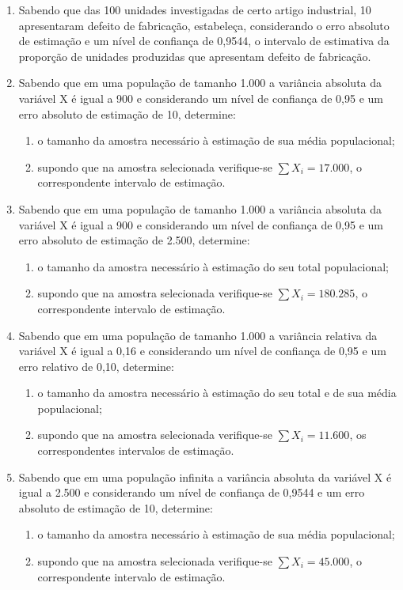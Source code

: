 \begin{enumerate}[resume]
\item Sabendo que das 100 unidades investigadas de certo artigo industrial, 10 apresentaram defeito de fabricação, estabeleça, considerando o erro absoluto de estimação e um nível de confiança de 0,9544, o intervalo de estimativa da proporção de
unidades produzidas que apresentam defeito de fabricação.

\item Sabendo que em uma população de tamanho 1.000 a variância absoluta da variável X é igual a 900 e considerando um nível de confiança de 0,95 e um erro absoluto de estimação de 10, determine:
	\begin{enumerate}
	\item o tamanho da amostra necessário à estimação de sua média populacional;
	\item supondo que na amostra selecionada verifique-se $\sum X_{i} = 17.000$, o correspondente intervalo de estimação.
	\end{enumerate}
	
\item Sabendo que em uma população de tamanho 1.000 a variância absoluta da variável X é igual a 900 e considerando um nível de confiança de 0,95 e um erro absoluto de estimação de 2.500, determine:
	\begin{enumerate}
	\item o tamanho da amostra necessário à estimação do seu total populacional;
	\item supondo que na amostra selecionada verifique-se $\sum X_{i} =  180.285$, o correspondente intervalo de estimação.
	\end{enumerate}

\item Sabendo que em uma população de tamanho 1.000 a variância relativa da variável X é igual a 0,16 e considerando um nível de confiança de 0,95 e um erro relativo de 0,10, determine:
	\begin{enumerate}
	\item o tamanho da amostra necessário à estimação do seu total e de sua média populacional;
	\item supondo que na amostra selecionada verifique-se $\sum X_{i} =  11.600$, os correspondentes intervalos de estimação.
	\end{enumerate}

\item Sabendo que em uma população infinita a variância absoluta da variável X é igual a 2.500 e considerando um nível de confiança de 0,9544 e um erro absoluto de estimação de 10, determine:
	\begin{enumerate}
	\item o tamanho da amostra necessário à estimação de sua média populacional;
	\item supondo que na amostra selecionada verifique-se $\sum X_{i} =  45.000$, o correspondente intervalo de estimação.	
	\end{enumerate}


\end{enumerate}
